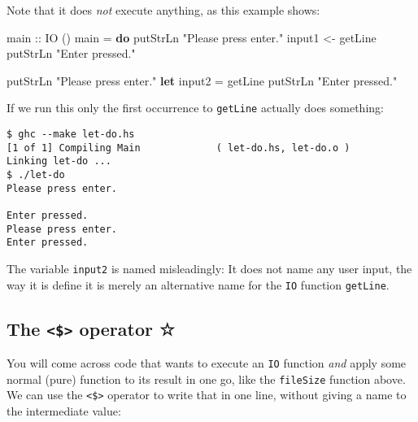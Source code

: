 \documentclass[11pt,
  american,
  DIV13]{article}
\newenvironment{Shaded}{}{}
\newcommand{\DataTypeTok}[1]{\textcolor[rgb]{0.56,0.13,0.00}{#1}}
\newcommand{\FunctionTok}[1]{\textcolor[rgb]{0.02,0.16,0.49}{#1}}
\newcommand{\KeywordTok}[1]{\textcolor[rgb]{0.00,0.44,0.13}{\textbf{#1}}}
\newcommand{\NormalTok}[1]{#1}
\newcommand{\OperatorTok}[1]{\textcolor[rgb]{0.40,0.40,0.40}{#1}}
\newcommand{\OtherTok}[1]{\textcolor[rgb]{0.00,0.44,0.13}{#1}}
\newcommand{\StringTok}[1]{\textcolor[rgb]{0.25,0.44,0.63}{#1}}
\begin{document}
Note that it does \emph{not} execute anything, as this example shows:

\begin{Shaded}
\begin{Highlighting}[]
\OtherTok{main ::} \DataTypeTok{IO}\NormalTok{ ()}
\NormalTok{main }\OtherTok{=} \KeywordTok{do}
    \FunctionTok{putStrLn} \StringTok{"Please press enter."}
\NormalTok{    input1 }\OtherTok{\textless{}{-}} \FunctionTok{getLine}
    \FunctionTok{putStrLn} \StringTok{"Enter pressed."}

    \FunctionTok{putStrLn} \StringTok{"Please press enter."}
    \KeywordTok{let}\NormalTok{ input2 }\OtherTok{=} \FunctionTok{getLine}
    \FunctionTok{putStrLn} \StringTok{"Enter pressed."}
\end{Highlighting}
\end{Shaded}

If we run this only the first occurrence to \texttt{getLine} actually
does something:

\begin{verbatim}
$ ghc --make let-do.hs
[1 of 1] Compiling Main             ( let-do.hs, let-do.o )
Linking let-do ...
$ ./let-do
Please press enter.

Enter pressed.
Please press enter.
Enter pressed.
\end{verbatim}

The variable \texttt{input2} is named misleadingly: It does not name any
user input, the way it is define it is merely an alternative name for
the \texttt{IO} function \texttt{getLine}.

\hypertarget{the-operator}{%
\subsection{\texorpdfstring{The \texttt{\textless{}\$\textgreater{}}
operator
☆}{The \textless\$\textgreater{} operator ☆}}\label{the-operator}}

You will come across code that wants to execute an \texttt{IO} function
\emph{and} apply some normal (pure) function to its result in one go,
like the \texttt{fileSize} function above. We can use the
\texttt{\textless{}\$\textgreater{}} operator to write that in one line,
without giving a name to the intermediate value:

\begin{Shaded}
\end{Shaded}
\end{document}
